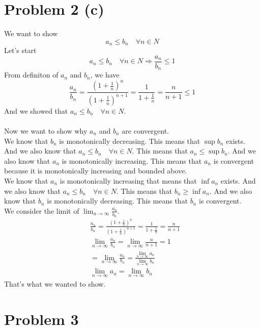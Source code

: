 \documentclass{article}
\begin{document}
\section*{Problem 2 (c)}
We want to show
\[
   a_n \leq b_n \quad \forall n \in N
\]
Let's start
\[
   a_n \leq b_n \quad \forall n \in N \Rightarrow \frac{a_n}{b_n} \leq 1
\]
From definiton of \(a_n\) and \(b_n\), we have
\[
   \frac{a_n}{b_n} = \frac{(1 + \frac{1}{n})^n}{(1 + \frac{1}{n})^{n+1}} = \frac{1}{1 + \frac{1}{n}} = \frac{n}{n+1} \leq 1
\]
And we showed that \(a_n \leq b_n \quad \forall n \in N\).\\
\\
Now we want to show why \(a_n\) and \(b_n\) are convergent.\\
We know that \(b_n\) is monotonically decreasing. This means that \(\sup b_n\) exists.
And we also know that \(a_n \leq b_n \quad \forall n \in N\). This means that \(a_n \leq \sup b_n\).
And we also know that \(a_n\) is monotonically increasing. This means that \(a_n\) is convergent 
because it is monotonically increasing and bounded above.\\
We know that \(a_n\) is monotonically increasing that means that \(\inf a_n\) exists. And we also know that
\(a_n \leq b_n \quad \forall n \in N\). This means that \(b_n \geq \inf a_n\).
And we also know that \(b_n\) is monotonically decreasing. This means that \(b_n\) is convergent.\\
We consider the limit of \(\lim_{n \rightarrow \infty}\frac{a_n}{b_n}\).
\begin{align*}
   & \frac{a_n}{b_n} = \frac{(1 + \frac{1}{n})^n}{(1 + \frac{1}{n})^{n+1}} = \frac{1}{1 + \frac{1}{n}} = \frac{n}{n+1} \\
   & \lim_{n \rightarrow \infty} \frac{a_n}{b_n} = \lim_{n \rightarrow \infty} \frac{n}{n+1} = 1 \\
   &=\lim_{n \rightarrow \infty} \frac{a_n}{b_n} = \frac{\lim_{n \rightarrow \infty} a_n}{\lim_{n \rightarrow \infty} b_n} \\
   &\lim_{n \rightarrow \infty} a_n = \lim_{n \rightarrow \infty} b_n
\end{align*}
That's what we wanted to show.

\section*{Problem 3}
\end{document}
